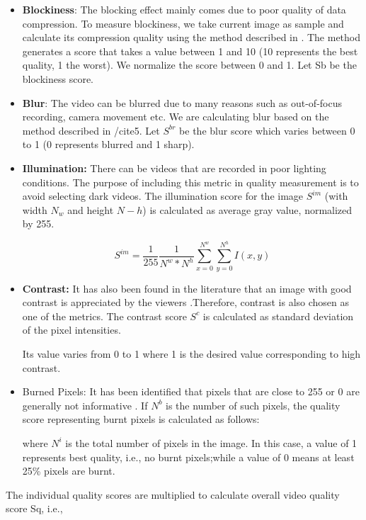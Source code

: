\documentclass{sig-alternate}
\begin{document}
\begin{itemize}
    \item \textbf{Blockiness}: The blocking effect mainly comes due to poor quality of data compression. To measure blockiness, we take current image as sample and calculate its compression quality using the method described in \cite{18}. The method generates a score that takes a value between 1 and 10 (10 represents the best quality, 1 the worst). We normalize the score between 0 and 1. Let Sb be the blockiness score.
    \item \textbf{Blur}: The video can be blurred due to many reasons such as out-of-focus recording, camera movement etc. We are calculating blur based on the method described in /cite{5}. Let $S^{br}$ be the blur score which varies between 0 to 1 (0 represents blurred and 1 sharp).
    \item \textbf{Illumination:} There can be videos that are recorded in poor lighting conditions. The purpose of including this metric in quality measurement is to avoid selecting dark videos. The illumination score for the image $S^{im}$ (with width $N_w$ and height $N-h$) is calculated as average gray value, normalized by 255.
    
    \begin{equation}
    S^{im} = \frac{1}{255}\frac{1}{N^w*N^h}\sum_{x=0}^{N^w}\sum_{y=0}^{N^h}I(x,y)
\end{equation}
    
    \item \textbf{Contrast:} It has also been found in the literature that an image with good contrast is appreciated by the viewers \cite{10}.Therefore, contrast is also chosen as one of the metrics. The contrast score $S^c$ is calculated as standard deviation of the pixel intensities.
    
    Its value varies from 0 to 1 where 1 is the desired value corresponding to high contrast.
    \item Burned Pixels: It has been identified that pixels that are close to 255 or 0 are generally not informative \cite{15}. If $N^b$ is the number of such pixels, the quality score representing burnt pixels is calculated as follows:
    
    where $N^i$ is the total number of pixels in the image. In this case, a value of 1 represents best quality, i.e., no burnt pixels;while a value of 0 means at least 25\% pixels are burnt.
    
    
    
\end{itemize}
The individual quality scores are multiplied to calculate overall video quality score Sq, i.e.,
\end{document}
